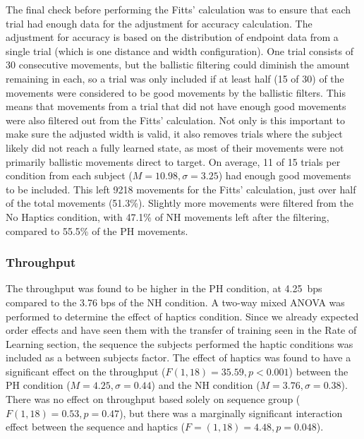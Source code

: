 The final check before performing the Fitts' calculation was to ensure that each trial had enough data for the adjustment for accuracy calculation.
The adjustment for accuracy is based on the distribution of endpoint data from a single trial (which is one distance and width configuration).
One trial consists of 30 consecutive movements, but the ballistic filtering could diminish the amount remaining in each, so a trial was only included if at least half (15 of 30) of the movements were considered to be good movements by the ballistic filters.
This means that movements from a trial that did not have enough good movements were also filtered out from the Fitts' calculation.
Not only is this important to make sure the adjusted width is valid, it also removes trials where the subject likely did not reach a fully learned state, as most of their movements were not primarily ballistic movements direct to target.
On average, 11 of 15 trials per condition from each subject ($M=10.98, \sigma=3.25$) had enough good movements to be included.
This left 9218 movements for the Fitts' calculation, just over half of the total movements (51.3\%).
Slightly more movements were filtered from the No Haptics condition, with 47.1\% of NH movements left after the filtering, compared to 55.5\% of the PH movements.

\subsubsection{Throughput}

The throughput was found to be higher in the PH condition, at 4.25~bps compared to the 3.76 bps of the NH condition.
A two-way mixed ANOVA was performed to determine the effect of haptics condition.
Since we already expected order effects and have seen them with the transfer of training seen in the Rate of Learning section, the sequence the subjects performed the haptic conditions was included as a between subjects factor.
The effect of haptics was found to have a significant effect on the throughput ($F(1,18)=35.59, p<0.001$) between the PH condition ($M=4.25, \sigma=0.44$) and the NH condition ($M=3.76, \sigma=0.38$).
There was no effect on throughput based solely on sequence group ($F(1,18)=0.53, p=0.47$), but there was a marginally significant interaction effect between the sequence and haptics ($F=(1,18)=4.48, p=0.048$).

